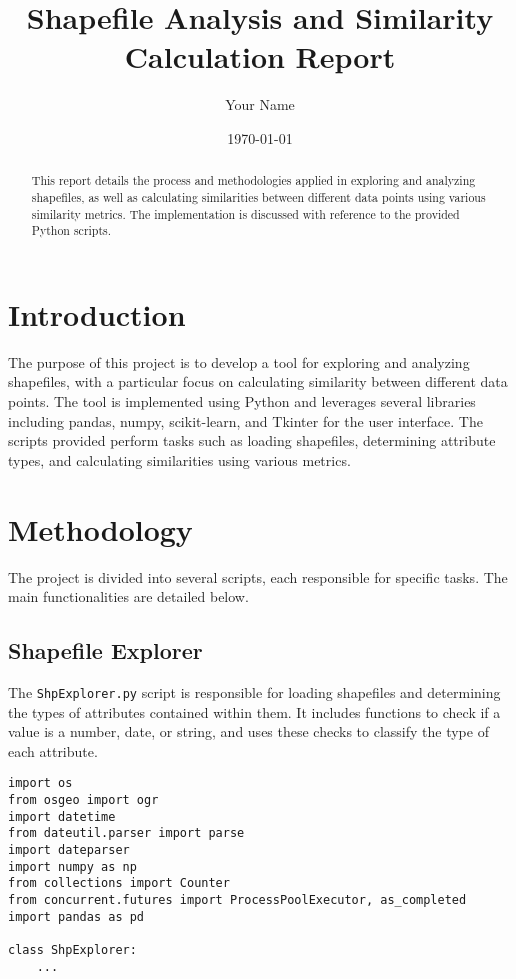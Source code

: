 \documentclass{article}
\title{Shapefile Analysis and Similarity Calculation Report}
\author{Your Name}
\date{\today}
\begin{document}
\maketitle

\begin{abstract}
This report details the process and methodologies applied in exploring and analyzing shapefiles, as well as calculating similarities between different data points using various similarity metrics. The implementation is discussed with reference to the provided Python scripts.
\end{abstract}

\section{Introduction}
The purpose of this project is to develop a tool for exploring and analyzing shapefiles, with a particular focus on calculating similarity between different data points. The tool is implemented using Python and leverages several libraries including pandas, numpy, scikit-learn, and Tkinter for the user interface. The scripts provided perform tasks such as loading shapefiles, determining attribute types, and calculating similarities using various metrics.

\section{Methodology}
The project is divided into several scripts, each responsible for specific tasks. The main functionalities are detailed below.

\subsection{Shapefile Explorer}
The \texttt{ShpExplorer.py} script is responsible for loading shapefiles and determining the types of attributes contained within them. It includes functions to check if a value is a number, date, or string, and uses these checks to classify the type of each attribute.

\begin{verbatim}
import os
from osgeo import ogr
import datetime
from dateutil.parser import parse
import dateparser
import numpy as np
from collections import Counter
from concurrent.futures import ProcessPoolExecutor, as_completed
import pandas as pd

class ShpExplorer:
    ...
\end{verbatim}
\end{document}
